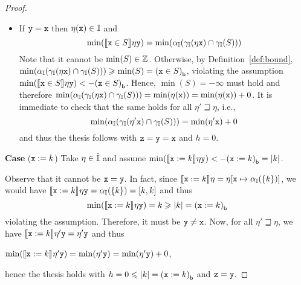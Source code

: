\begin{proof}
\begin{itemize}
  \item If \(\var[y] = \var[x]\) then \(\eta(\var) \in \Int\) and
    \begin{equation*}
      \min(\semi{\var \in S}\eta \var[y]) = \min(\abstr[\Int](\concr[\Int](\eta\var) \cap \concr[\Int](S)))
    \end{equation*}
    Note that it cannot be \(\min(S)\in \z\). Otherwise, by
    Definition~\ref{def:bound},
    \(\min ({\abstr[\Int](\concr[\Int](\eta\var) \cap \concr[\Int](S))})
    \geq \min(S)= \lbound{\var \in S}\), violating the assumption
    \(\min(\semi{\var \in S}\eta \var[y]) < - \lbound{\var \in S}\).
    Hence, \(\min(S) = -\infty\) must hold and therefore %
    \(\min ({\abstr[\Int](\concr[\Int](\eta\var) \cap
      \concr[\Int](S))}) = \min(\eta(\var)) = \min(\eta(\var)) +
    0\). It is immediate to check that the same holds for all
    \(\eta' \sqsupseteq \eta\), i.e.,
    \begin{equation*}
      \min(\abstr[\Int](\concr[\Int](\eta'\var) \cap \concr[\Int](S))) = \min(\eta'\var) + 0
    \end{equation*}
    and thus the thesis follows with  \(\var[z]=\var[y]=\var[x]\) and \(h=0\).
  \end{itemize}  
  
  \medskip
  
  \noindent
  \textbf{Case} (\(\var := k\))
  Take \(\eta \in \inte\) and assume
  \(\min(\semi{\var := k}\eta \var[y]) < -\lbound{\var := k} = |k|\).

  Observe that it cannot be \(\var = \var[y]\). In fact, since
  \(\semi{\var := k}\eta = \eta[\var \mapsto \abstr[\Int](\{k\})]\),
  we would have
  \(\semi{\var := k}\eta \var[y] = \abstr[\Int](\{k\}) =
  \interval{k}{k}\) and thus %
  \begin{equation*}
    \min(\semi{\var := k}\eta \var[y]) = k \geq |k| = \lbound{\var := k}
  \end{equation*}
  violating the assumption.
  Therefore, it must be \(\var[y] \neq \var\). Now, for all
  \(\eta' \sqsupseteq \eta\), we have
  \(\semi{\var := k}\eta' \var[y] = \eta' \var[y]\) and thus
  \begin{center}
    \(\min(\semi{\var := k}\eta' \var[y]) = \min(\eta' \var[y]) =
    \min(\eta' \var[y]) + 0\),
  \end{center}
  hence the thesis holds with \(h =0 \leq |k| = \lbound{\var :=k}\)
  and \(\var[z] = \var[y]\).
  

\end{proof}
